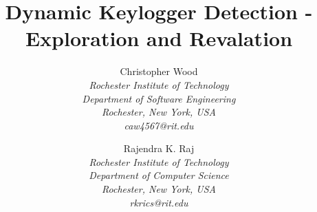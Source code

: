 \documentclass[times, 10pt,twocolumn]{article}
\begin{document}
\title{Dynamic Keylogger Detection - Exploration and Revalation}

\author{Christopher Wood\\
{\em Rochester Institute of Technology}\\
{\em Department of Software Engineering}\\
{\em Rochester, New York, USA}\\
{\em caw4567@rit.edu}
\and
Rajendra K. Raj\\
{\em Rochester Institute of Technology}\\
{\em Department of Computer Science}\\
{\em Rochester, New York, USA}\\
{\em rkrics@rit.edu}
}
\maketitle
\thispagestyle{empty}
\end{document}
